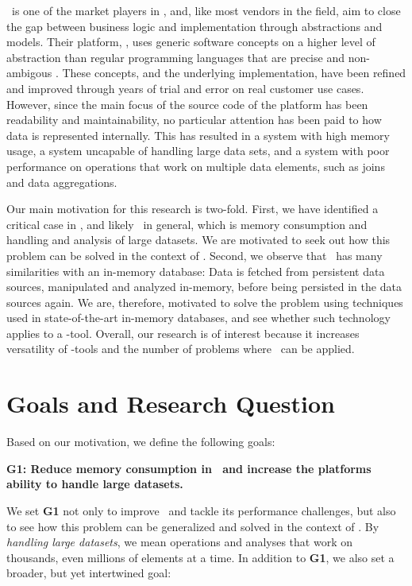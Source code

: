 \genus~is one of the market players in \mde, and, like most vendors in the field, aim to close the gap between business logic and implementation through abstractions and models. Their platform, \gap, uses generic software concepts on a higher level of abstraction than regular programming languages that are precise and non-ambigous \cite{noauthor_undated-qy}. These concepts, and the underlying implementation, have been refined and improved through years of trial and error on real customer use cases. However, since the main focus of the source code of the platform has been readability and maintainability, no particular attention has been paid to how data is represented internally. This has resulted in a system with high memory usage, a system uncapable of handling large data sets, and a system with poor performance on operations that work on multiple data elements, such as joins and data aggregations.

Our main motivation for this research is two-fold. First, we have identified a critical case in \gap, and likely \mde~in general, which is memory consumption and handling and analysis of large datasets. We are motivated to seek out how this problem can be solved in the context of \mdd. Second, we observe that \gap~has many similarities with an in-memory database: Data is fetched from persistent data sources, manipulated and analyzed in-memory, before being persisted in the data sources again. We are, therefore, motivated to solve the problem using techniques used in state-of-the-art in-memory databases, and see whether such technology applies to a \mde-tool. Overall, our research is of interest because it increases versatility of \mdd-tools and the number of problems where \mde~can be applied.

\section{Goals and Research Question}
\label{sec:Goals and Research Question}
Based on our motivation, we define the following goals:

\setlength{\leftskip}{1cm}

\textbf{G1: Reduce memory consumption in \gap~and increase the platforms ability to handle large datasets.}

\setlength{\leftskip}{0pt}

We set \textbf{G1} not only to improve \gap~and tackle its performance challenges, but also to see how this problem can be generalized and solved in the context of \mde. By \textit{handling large datasets}, we mean operations and analyses that work on thousands, even millions of elements at a time. In addition to \textbf{G1}, we also set a broader, but yet intertwined goal:

